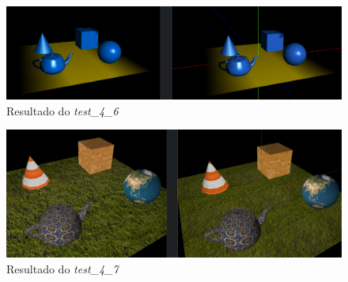 \documentclass[runningheads]{llncs}
\begin{document}
    \begin{landscape}
        \begin{figure}
            \centering
            \includegraphics[width=\linewidth]{assets/testes/teste_4_6.png}
            \caption{Resultado do \textit{test\_4\_6}} \label{fig:teste_4_6}
        \end{figure}
    \end{landscape}

    \begin{landscape}
        \begin{figure}
            \centering
            \includegraphics[width=\linewidth]{assets/testes/teste_4_7.png}
            \caption{Resultado do \textit{test\_4\_7}} \label{fig:teste_4_7}
        \end{figure}
    \end{landscape}

    

    
\end{document}
